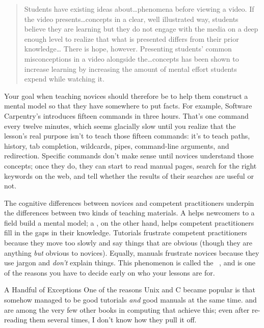 \begin{quote}

  Students have existing ideas about{\ldots}phenomena before viewing a video.
  If the video presents{\ldots}concepts in a clear, well illustrated way,
  students believe they are learning but they do not engage with the media on a deep enough level
  to realize that what is presented differs from their prior knowledge{\ldots}
  There is hope, however.
  Presenting students' common misconceptions in a video alongside the{\ldots}concepts
  has been shown to increase learning
  by increasing the amount of mental effort students expend while watching it.

\end{quote}

Your goal when teaching novices should therefore be
to help them construct a mental model
so that they have somewhere to put facts.
For example,
Software Carpentry's
introduces fifteen commands in three hours.
That's one command every twelve minutes,
which seems glacially slow until you realize that
the lesson's real purpose isn't to teach those fifteen commands:
it's to teach paths,
history,
tab completion,
wildcards,
pipes,
command-line arguments,
and redirection.
Specific commands don't make sense until novices understand those concepts;
once they do,
they can start to read manual pages,
search for the right keywords on the web,
and tell whether the results of their searches are useful or not.

The cognitive differences between novices and competent practitioners
underpin the differences between two kinds of teaching materials.
A  helps newcomers to a field build a mental model;
a ,
on the other hand,
helps competent practitioners fill in the gaps in their knowledge.
Tutorials frustrate competent practitioners because they move too slowly
and say things that are obvious
(though they are anything \emph{but} obvious to novices).
Equally,
manuals frustrate novices because they use jargon and \emph{don't} explain things.
This phenomenon is called the ~\cite{Kaly2003},
and is one of the reasons you have to decide early on
who your lessons are for.

\begin{aside}{A Handful of Exceptions}
  One of the reasons Unix and C became popular is that
  \cite{Kern1978,Kern1983,Kern1988}
  somehow managed to be good tutorials \emph{and} good manuals at the same time.
  \cite{Fehi2008} and~\cite{Ray2014} are among the very few other books in computing that achieve this;
  even after re-reading them several times,
  I don't know how they pull it off.
\end{aside}

